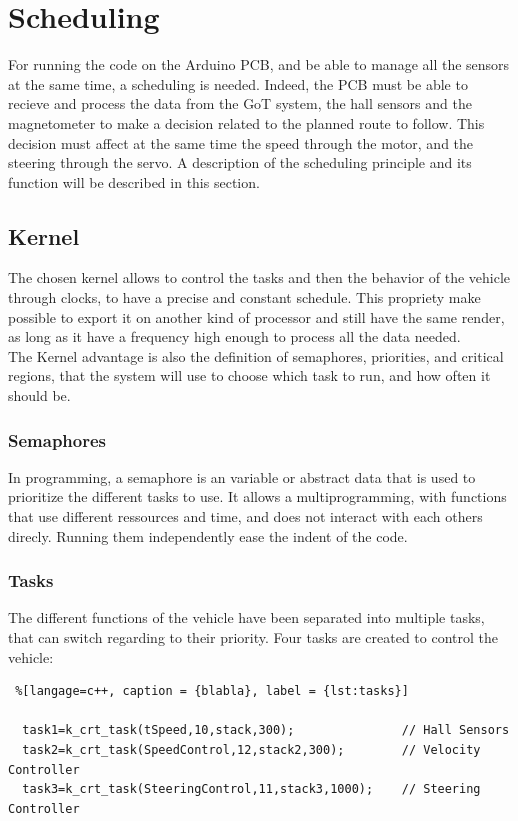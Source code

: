 \section{Scheduling}\label{sec:scheduling}
For running the code on the Arduino PCB, and be able to manage all the sensors at the same time, a scheduling is needed. Indeed, the PCB must be able to recieve and process the data from the GoT system, the hall sensors and the magnetometer to make a decision related to the planned route to follow. This decision must affect at the same time the speed through the motor, and the steering through the servo.
A description of the scheduling principle and its function will be described in this section.


\subsection{Kernel}
The chosen kernel allows to control the tasks and then the behavior of the vehicle through clocks, to have a precise and constant schedule. This propriety make possible to export it on another kind of processor and still have the same render, as long as it have a frequency high enough to process all the data needed.\\
The Kernel advantage is also the definition of semaphores, priorities, and critical regions, that the system will use to choose which task to run, and how often it should be.


\subsubsection{Semaphores}
In programming, a semaphore is an variable or abstract data that is used to prioritize the different tasks to use. It allows a multiprogramming, with functions that use different ressources and time, and does not interact with each others direcly. Running them independently ease the indent of the code.



\subsubsection{Tasks}
The different functions of the vehicle have been separated into multiple tasks, that can switch regarding to their priority. Four tasks are created to control the vehicle:

\begin{lstlisting} %[langage=c++, caption = {blabla}, label = {lst:tasks}]

  task1=k_crt_task(tSpeed,10,stack,300);               // Hall Sensors
  task2=k_crt_task(SpeedControl,12,stack2,300);        // Velocity Controller
  task3=k_crt_task(SteeringControl,11,stack3,1000);    // Steering Controller

\end{lstlisting}

